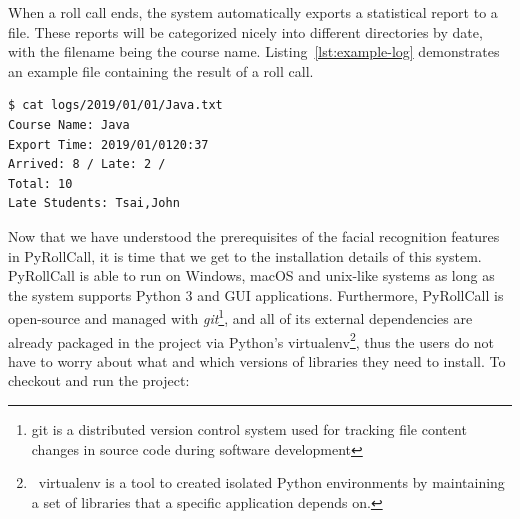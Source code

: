 



When a roll call ends, the system automatically exports a statistical report to a file.
These reports will be categorized nicely into different directories by date,
with the filename being the course name. Listing~\ref{lst:example-log} demonstrates
an example file containing the result of a roll call.
\clearpage

\begin{lstlisting}[numbers=none,xleftmargin=0em,caption={Layout of PyRollCall's root directory.},label={lst:example-log}]
$ cat logs/2019/01/01/Java.txt
Course Name: Java
Export Time: 2019/01/0120:37
Arrived: 8 / Late: 2 / 
Total: 10
Late Students: Tsai,John
\end{lstlisting}

Now that we have understood the prerequisites of the facial recognition features in PyRollCall,
it is time that we get to the installation details of this system. PyRollCall is able to run on Windows,
macOS and unix-like systems as long as the system supports Python 3 and GUI applications.
Furthermore, PyRollCall is open-source and managed with \emph{git}\footnote{git is a distributed
  version control system used for tracking file content changes in source code during software development},
and all of its external dependencies are already packaged in the project via Python's {virtualenv}\footnote{\
  virtualenv is a tool to created isolated Python environments by maintaining a set of libraries that a specific application depends on.},
thus the users do not have to worry about what and which versions of libraries they need to install. To checkout and run the project:

